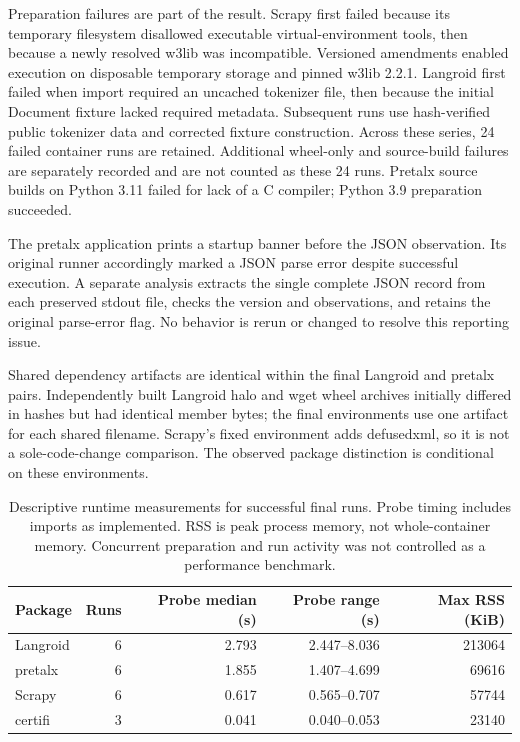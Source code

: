 \documentclass[manuscript,screen,nonacm]{acmart}
\begin{document}
Preparation failures are part of the result. Scrapy first failed because its temporary filesystem disallowed executable virtual-environment tools, then because a newly resolved w3lib was incompatible. Versioned amendments enabled execution on disposable temporary storage and pinned w3lib 2.2.1. Langroid first failed when import required an uncached tokenizer file, then because the initial Document fixture lacked required metadata. Subsequent runs use hash-verified public tokenizer data and corrected fixture construction. Across these series, 24 failed container runs are retained. Additional wheel-only and source-build failures are separately recorded and are not counted as these 24 runs. Pretalx source builds on Python 3.11 failed for lack of a C compiler; Python 3.9 preparation succeeded.

The pretalx application prints a startup banner before the JSON observation. Its original runner accordingly marked a JSON parse error despite successful execution. A separate analysis extracts the single complete JSON record from each preserved stdout file, checks the version and observations, and retains the original parse-error flag. No behavior is rerun or changed to resolve this reporting issue.

Shared dependency artifacts are identical within the final Langroid and pretalx pairs. Independently built Langroid halo and wget wheel archives initially differed in hashes but had identical member bytes; the final environments use one artifact for each shared filename. Scrapy's fixed environment adds defusedxml, so it is not a sole-code-change comparison. The observed package distinction is conditional on these environments.

\begin{table}[t]
\caption{Descriptive runtime measurements for successful final runs. Probe timing includes imports as implemented. RSS is peak process memory, not whole-container memory. Concurrent preparation and run activity was not controlled as a performance benchmark.}
\label{tab:runtime}
\begin{tabular}{lrrrr}
\toprule Package & Runs & Probe median (s) & Probe range (s) & Max RSS (KiB) \\
\midrule
Langroid &6&2.793&2.447--8.036&213064\\
pretalx &6&1.855&1.407--4.699&69616\\
Scrapy &6&0.617&0.565--0.707&57744\\
certifi &3&0.041&0.040--0.053&23140\\
\bottomrule
\end{tabular}
\end{table}
\end{document}
